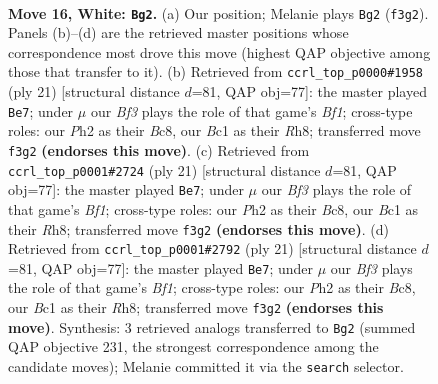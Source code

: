 \documentclass[11pt]{article}
\begin{document}
\clearpage

\begin{figure}[p]\centering
\begin{subfigure}{0.46\textwidth}\centering
\resizebox{\linewidth}{!}{%
\newchessgame
\chessboard[
  setfen={r3b1k1/p1qrbpp1/npp1pn2/7p/P1NP1P2/1PN2BP1/4P2P/R1BQR1K1 w - - 2 16},
  showmover=false,
  pgfstyle=straightmove, color=movearrow, markmove={f3-g2}
]}
\caption{}
\end{subfigure}\hfill
\begin{subfigure}{0.46\textwidth}\centering
\resizebox{\linewidth}{!}{%
\newchessgame
\chessboard[
  setfen={r1bqkb1r/7p/ppn1ppp1/3p3n/3P3B/P1N1PN2/1P3PPP/R2QKB1R b KQkq - 1 11},
  showmover=false,
  pgfstyle=straightmove, color=movearrow, markmove={f8-e7}
]}
\caption{}
\end{subfigure}
\\[4pt]
\begin{subfigure}{0.46\textwidth}\centering
\resizebox{\linewidth}{!}{%
\newchessgame
\chessboard[
  setfen={r1bqkb1r/7p/ppn1ppp1/3p3n/3P3B/P1N1PN2/1P3PPP/R2QKB1R b KQkq - 1 11},
  showmover=false,
  pgfstyle=straightmove, color=movearrow, markmove={f8-e7}
]}
\caption{}
\end{subfigure}\hfill
\begin{subfigure}{0.46\textwidth}\centering
\resizebox{\linewidth}{!}{%
\newchessgame
\chessboard[
  setfen={r1bqkb1r/7p/ppn1ppp1/3p3n/3P3B/P1N1PN2/1P3PPP/R2QKB1R b KQkq - 1 11},
  showmover=false,
  pgfstyle=straightmove, color=movearrow, markmove={f8-e7}
]}
\caption{}
\end{subfigure}
\caption{\textbf{Move 16, White: \texttt{Bg2}.} (a) Our position; Melanie plays \texttt{Bg2} (\texttt{f3g2}). Panels (b)--(d) are the retrieved master positions whose correspondence most drove this move (highest QAP objective among those that transfer to it). (b) Retrieved from \texttt{ccrl\_top\_p0000\#1958} (ply 21) [structural distance $d$=81, QAP obj=77]: the master played \texttt{Be7}; under $\mu$ our \emph{Bf3} plays the role of that game's \emph{Bf1}; cross-type roles: our \emph{P}h2 as their \emph{B}c8, our \emph{B}c1 as their \emph{R}h8; transferred move \texttt{f3g2} \textbf{(endorses this move)}. (c) Retrieved from \texttt{ccrl\_top\_p0001\#2724} (ply 21) [structural distance $d$=81, QAP obj=77]: the master played \texttt{Be7}; under $\mu$ our \emph{Bf3} plays the role of that game's \emph{Bf1}; cross-type roles: our \emph{P}h2 as their \emph{B}c8, our \emph{B}c1 as their \emph{R}h8; transferred move \texttt{f3g2} \textbf{(endorses this move)}. (d) Retrieved from \texttt{ccrl\_top\_p0001\#2792} (ply 21) [structural distance $d$=81, QAP obj=77]: the master played \texttt{Be7}; under $\mu$ our \emph{Bf3} plays the role of that game's \emph{Bf1}; cross-type roles: our \emph{P}h2 as their \emph{B}c8, our \emph{B}c1 as their \emph{R}h8; transferred move \texttt{f3g2} \textbf{(endorses this move)}. Synthesis: 3 retrieved analogs transferred to \texttt{Bg2} (summed QAP objective 231, the strongest correspondence among the candidate moves); Melanie committed it via the \texttt{search} selector.}
\label{fig:thought-m30}
\end{figure}
\end{document}
